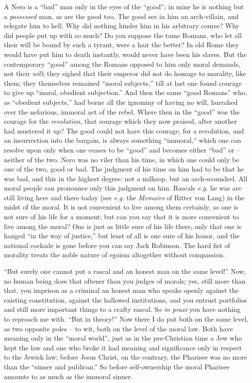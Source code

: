 A Nero is a ``bad'' man only in the eyes of the ``good''; in mine he is 
nothing but a \textit{possessed} man, as are the good too. The good see in him 
an arch-villain, and relegate him to hell. Why did nothing hinder him in his 
arbitrary course? Why did people put up with so much? Do you suppose the tame 
Romans, who let all their will be bound by such a tyrant, were a hair the 
better? In old Rome they would have put him to death instantly, would never 
have been his slaves. But the contemporary ``good'' among the Romans opposed 
to him only moral demands, not their \textit{will}; they sighed that their 
emperor did not do homage to morality, like them; they themselves remained 
``moral subjects,'' till at last one found courage to give up ``moral, 
obedient subjection.'' And then the same ``good Romans'' who, as 
``obedient subjects,'' had borne all the ignominy of having no will, 
hurrahed over the nefarious, immoral act of the rebel. Where then in the 
``good'' was the courage for the \textit{revolution}, that courage which 
they now praised, after another had mustered it up? The good could not have 
this courage, for a revolution, and an insurrection into the bargain, is 
always something ``immoral,'' which one can resolve upon only when one 
ceases to be ``good'' and becomes either ``bad'' or -- neither of the two. 
Nero was no viler than his time, in which one could only be one of the two, 
good or bad. The judgment of his time on him had to be that he was bad, and 
this in the highest degree: not a milksop, but an arch-scoundrel. All moral 
people can pronounce only this judgment on him. Rascals \textit{e.g.} he was 
are still living here and there today (see \textit{e.g.} the \textit{Memoirs} 
of Ritter von Lang) in the midst of the moral. It is not convenient to live 
among them certainly, as one is not sure of his life for a moment; but can you 
say that it is more convenient to live among the moral? One is just as little 
sure of his life there, only that one is hanged ``in the way of justice,'' 
but least of all is one sure of his honor, and the national cockade is gone 
before you can say Jack Robinson. The hard fist of morality treats the noble 
nature of egoism altogether without compassion.

``But surely one cannot put a rascal and an honest man on the same level!'' 
Now, no human being does that oftener than you judges of morals; yes, still 
more than that, you imprison as a criminal an honest man who speaks openly 
against the existing constitution, against the hallowed institutions, and you 
entrust portfolios and still more important things to a crafty rascal. So 
\textit{in praxi} you have nothing to reproach me with. ``But in theory!'' 
Now there I do put both on the same level, as two opposite poles -- to wit, 
both on the level of the moral law. Both have meaning only in the ``moral 
world'', just as in the pre-Christian time a Jew who kept the law and one who 
broke it had meaning and significance only in respect to the Jewish law; 
before Jesus Christ, on the contrary, the Pharisee was no more than the 
``sinner and publican.'' So before self-ownership the moral Pharisee amounts 
to as much as the immoral sinner.

